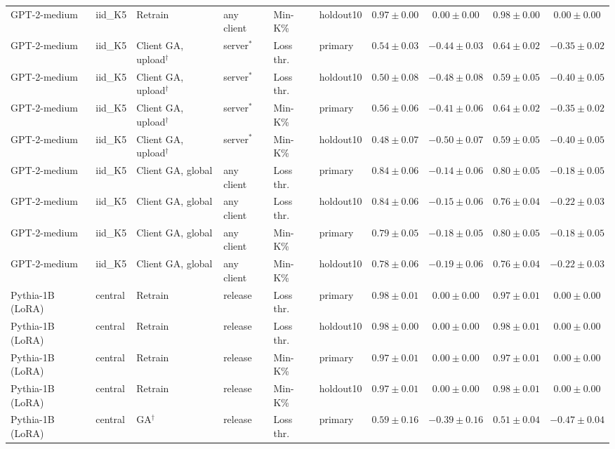 \begin{table}[t]
\begin{tabular*}{\textwidth}{@{\extracolsep{\fill}}llllllcccc@{}}
GPT-2-medium & iid\_K5 & Retrain & any client & Min-K\% & holdout10 & $0.97 \pm 0.00$ & $0.00 \pm 0.00$ & $0.98 \pm 0.00$ & $0.00 \pm 0.00$ \\
GPT-2-medium & iid\_K5 & Client GA, upload$^{\dagger}$ & server$^{*}$ & Loss thr. & primary & $0.54 \pm 0.03$ & $-0.44 \pm 0.03$ & $0.64 \pm 0.02$ & $-0.35 \pm 0.02$ \\
GPT-2-medium & iid\_K5 & Client GA, upload$^{\dagger}$ & server$^{*}$ & Loss thr. & holdout10 & $0.50 \pm 0.08$ & $-0.48 \pm 0.08$ & $0.59 \pm 0.05$ & $-0.40 \pm 0.05$ \\
GPT-2-medium & iid\_K5 & Client GA, upload$^{\dagger}$ & server$^{*}$ & Min-K\% & primary & $0.56 \pm 0.06$ & $-0.41 \pm 0.06$ & $0.64 \pm 0.02$ & $-0.35 \pm 0.02$ \\
GPT-2-medium & iid\_K5 & Client GA, upload$^{\dagger}$ & server$^{*}$ & Min-K\% & holdout10 & $0.48 \pm 0.07$ & $-0.50 \pm 0.07$ & $0.59 \pm 0.05$ & $-0.40 \pm 0.05$ \\
GPT-2-medium & iid\_K5 & Client GA, global & any client & Loss thr. & primary & $0.84 \pm 0.06$ & $-0.14 \pm 0.06$ & $0.80 \pm 0.05$ & $-0.18 \pm 0.05$ \\
GPT-2-medium & iid\_K5 & Client GA, global & any client & Loss thr. & holdout10 & $0.84 \pm 0.06$ & $-0.15 \pm 0.06$ & $0.76 \pm 0.04$ & $-0.22 \pm 0.03$ \\
GPT-2-medium & iid\_K5 & Client GA, global & any client & Min-K\% & primary & $0.79 \pm 0.05$ & $-0.18 \pm 0.05$ & $0.80 \pm 0.05$ & $-0.18 \pm 0.05$ \\
GPT-2-medium & iid\_K5 & Client GA, global & any client & Min-K\% & holdout10 & $0.78 \pm 0.06$ & $-0.19 \pm 0.06$ & $0.76 \pm 0.04$ & $-0.22 \pm 0.03$ \\
Pythia-1B (LoRA) & central & Retrain & release & Loss thr. & primary & $0.98 \pm 0.01$ & $0.00 \pm 0.00$ & $0.97 \pm 0.01$ & $0.00 \pm 0.00$ \\
Pythia-1B (LoRA) & central & Retrain & release & Loss thr. & holdout10 & $0.98 \pm 0.00$ & $0.00 \pm 0.00$ & $0.98 \pm 0.01$ & $0.00 \pm 0.00$ \\
Pythia-1B (LoRA) & central & Retrain & release & Min-K\% & primary & $0.97 \pm 0.01$ & $0.00 \pm 0.00$ & $0.97 \pm 0.01$ & $0.00 \pm 0.00$ \\
Pythia-1B (LoRA) & central & Retrain & release & Min-K\% & holdout10 & $0.97 \pm 0.01$ & $0.00 \pm 0.00$ & $0.98 \pm 0.01$ & $0.00 \pm 0.00$ \\
Pythia-1B (LoRA) & central & GA$^{\dagger}$ & release & Loss thr. & primary & $0.59 \pm 0.16$ & $-0.39 \pm 0.16$ & $0.51 \pm 0.04$ & $-0.47 \pm 0.04$ \\

\end{tabular*}
\end{table}
